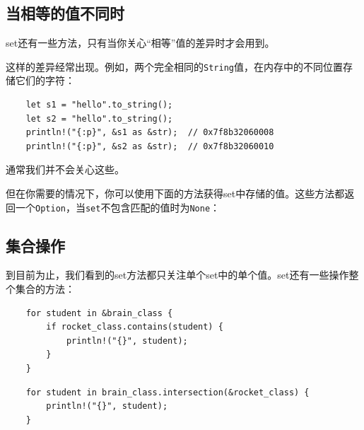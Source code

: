 \subsection{当相等的值不同时}
set还有一些方法，只有当你关心“相等”值的差异时才会用到。

这样的差异经常出现。例如，两个完全相同的\texttt{String}值，在内存中的不同位置存储它们的字符：

\begin{verbatim}
    let s1 = "hello".to_string();
    let s2 = "hello".to_string();
    println!("{:p}", &s1 as &str);  // 0x7f8b32060008
    println!("{:p}", &s2 as &str);  // 0x7f8b32060010
\end{verbatim}

通常我们并不会关心这些。

但在你需要的情况下，你可以使用下面的方法获得set中存储的值。这些方法都返回一个\texttt{Option}，当\texttt{set}不包含匹配的值时为\texttt{None}：




\subsection{集合操作}
到目前为止，我们看到的set方法都只关注单个set中的单个值。set还有一些操作整个集合的方法：

\begin{verbatim}
    for student in &brain_class {
        if rocket_class.contains(student) {
            println!("{}", student);
        }
    }
\end{verbatim}
\begin{verbatim}
    for student in brain_class.intersection(&rocket_class) {
        println!("{}", student);
    }
\end{verbatim}

